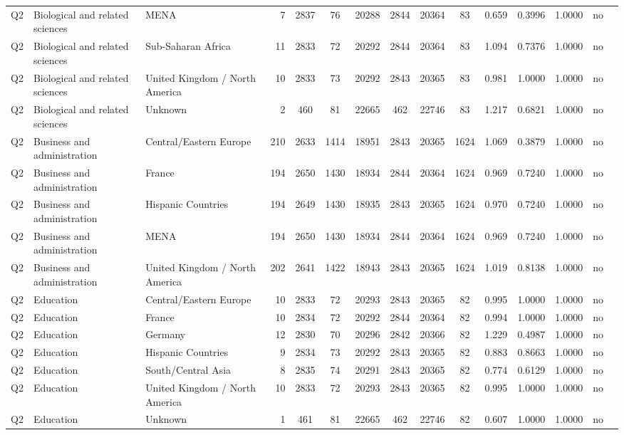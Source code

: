 \begin{longtable}{lllrcccccccccll}
Q2 & Biological and related sciences & MENA & 7 & 2837 & 76 & 20288 & 2844 & 20364 & 83 & 0.659 & 0.3996 & 1.0000 & no \\
Q2 & Biological and related sciences & Sub-Saharan Africa & 11 & 2833 & 72 & 20292 & 2844 & 20364 & 83 & 1.094 & 0.7376 & 1.0000 & no \\
Q2 & Biological and related sciences & United Kingdom / North America & 10 & 2833 & 73 & 20292 & 2843 & 20365 & 83 & 0.981 & 1.0000 & 1.0000 & no \\
Q2 & Biological and related sciences & Unknown & 2 & 460 & 81 & 22665 & 462 & 22746 & 83 & 1.217 & 0.6821 & 1.0000 & no \\
Q2 & Business and administration & Central/Eastern Europe & 210 & 2633 & 1414 & 18951 & 2843 & 20365 & 1624 & 1.069 & 0.3879 & 1.0000 & no \\
Q2 & Business and administration & France & 194 & 2650 & 1430 & 18934 & 2844 & 20364 & 1624 & 0.969 & 0.7240 & 1.0000 & no \\
Q2 & Business and administration & Hispanic Countries & 194 & 2649 & 1430 & 18935 & 2843 & 20365 & 1624 & 0.970 & 0.7240 & 1.0000 & no \\
Q2 & Business and administration & MENA & 194 & 2650 & 1430 & 18934 & 2844 & 20364 & 1624 & 0.969 & 0.7240 & 1.0000 & no \\
Q2 & Business and administration & United Kingdom / North America & 202 & 2641 & 1422 & 18943 & 2843 & 20365 & 1624 & 1.019 & 0.8138 & 1.0000 & no \\
Q2 & Education & Central/Eastern Europe & 10 & 2833 & 72 & 20293 & 2843 & 20365 & 82 & 0.995 & 1.0000 & 1.0000 & no \\
Q2 & Education & France & 10 & 2834 & 72 & 20292 & 2844 & 20364 & 82 & 0.994 & 1.0000 & 1.0000 & no \\
Q2 & Education & Germany & 12 & 2830 & 70 & 20296 & 2842 & 20366 & 82 & 1.229 & 0.4987 & 1.0000 & no \\
Q2 & Education & Hispanic Countries & 9 & 2834 & 73 & 20292 & 2843 & 20365 & 82 & 0.883 & 0.8663 & 1.0000 & no \\
Q2 & Education & South/Central Asia & 8 & 2835 & 74 & 20291 & 2843 & 20365 & 82 & 0.774 & 0.6129 & 1.0000 & no \\
Q2 & Education & United Kingdom / North America & 10 & 2833 & 72 & 20293 & 2843 & 20365 & 82 & 0.995 & 1.0000 & 1.0000 & no \\
Q2 & Education & Unknown & 1 & 461 & 81 & 22665 & 462 & 22746 & 82 & 0.607 & 1.0000 & 1.0000 & no \\

\end{longtable}
